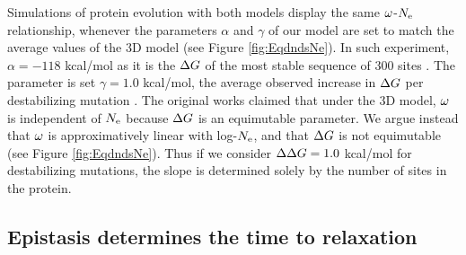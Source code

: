 \documentclass{article}
\begin{document}
Simulations of protein evolution with both models display the same $\omega$-$N_{\mathrm{e}}$ relationship, whenever the parameters $\alpha$ and $\gamma$ of our model are set to match the average values of the $3$D model (see Figure \ref{fig:EqdndsNe}).
In such experiment, $\alpha=-118$ kcal/mol as it is the $\Delta G$ of the most stable sequence of $300$ sites \cite{Goldstein2011}.
The parameter is set $\gamma=1.0$ kcal/mol, the average observed increase in $\Delta G$ per destabilizing mutation \cite{Zeldovich2007}.
The original works claimed that under the $3$D model, $\omega$ is independent of $N_{\mathrm{e}}$ because $\Delta G$ is an equimutable parameter.
We argue instead that $\omega$ is approximatively linear with log-$N_{\mathrm{e}}$, and that $\Delta G$ is not equimutable (see Figure \ref{fig:EqdndsNe}).
Thus if we consider $\Delta \Delta G = 1.0$ kcal/mol for destabilizing mutations, the slope is determined solely by the number of sites in the protein. 


\subsection*{Epistasis determines the time to relaxation}
\end{document}
